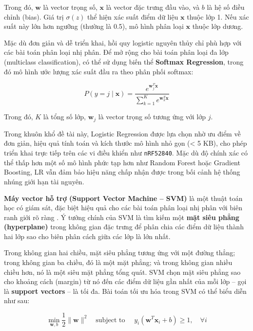 Trong đó, $\mathbf{w}$ là vector trọng số, $\mathbf{x}$ là vector đặc trưng đầu vào, và $b$ là hệ số điều chỉnh (bias). Giá trị $\sigma(z)$ thể hiện xác suất điểm dữ liệu $\mathbf{x}$ thuộc lớp 1. Nếu xác suất này lớn hơn ngưỡng (thường là 0.5), mô hình phân loại $\mathbf{x}$ thuộc lớp dương.

Mặc dù đơn giản và dễ triển khai, hồi quy logistic nguyên thủy chỉ phù hợp với các bài toán phân loại nhị phân. Để mở rộng cho bài toán phân loại đa lớp (multiclass classification), có thể sử dụng biến thể \textbf{Softmax Regression}, trong đó mô hình ước lượng xác suất đầu ra theo phân phối softmax:

\begin{equation}
    P(y = j \mid \mathbf{x}) = \frac{e^{\mathbf{w}_j^T \mathbf{x}}}{\sum_{k=1}^{K} e^{\mathbf{w}_k^T \mathbf{x}}}
\end{equation}

Trong đó, $K$ là tổng số lớp, $\mathbf{w}_j$ là vector trọng số tương ứng với lớp $j$.

Trong khuôn khổ đề tài này, Logistic Regression được lựa chọn nhờ ưu 
điểm về đơn giản, hiệu quả tính toán và kích thước mô hình nhỏ gọn 
(< 5 KB), cho phép triển khai trực tiếp trên các vi điều khiển như 
\texttt{nRF52840}. Mặc dù độ chính xác có thể thấp hơn một số mô hình 
phức tạp hơn như Random Forest hoặc Gradient Boosting, LR vẫn đảm bảo 
hiệu năng chấp nhận được trong bối cảnh hệ thống nhúng giới hạn tài 
nguyên.

\textbf{Máy vector hỗ trợ (Support Vector Machine – SVM)} là một thuật 
toán học có giám sát, đặc biệt hiệu quả cho các bài toán phân loại nhị 
phân với biên ranh giới rõ ràng \cite{cortes1995svm}. Ý tưởng chính của SVM là tìm kiếm một 
\textbf{mặt siêu phẳng (hyperplane)} trong không gian đặc trưng để phân 
chia các điểm dữ liệu thành hai lớp sao cho biên phân cách giữa các lớp 
là lớn nhất.

Trong không gian hai chiều, mặt siêu phẳng tương ứng với một đường thẳng; 
trong không gian ba chiều, đó là một mặt phẳng; và trong không gian 
nhiều chiều hơn, nó là một siêu mặt phẳng tổng quát. 
SVM chọn mặt siêu phẳng sao cho khoảng cách (margin) từ nó đến các 
điểm dữ liệu gần nhất của mỗi lớp – gọi là \textbf{support vectors} – 
là tối đa. Bài toán tối ưu hóa trong SVM có thể biểu diễn như sau:

\begin{equation}
\min_{\mathbf{w}, b} \frac{1}{2} \|\mathbf{w}\|^2 \quad 
\text{subject to } \quad y_i(\mathbf{w}^T \mathbf{x}_i + b) \geq 1, \quad \forall i
\end{equation}

